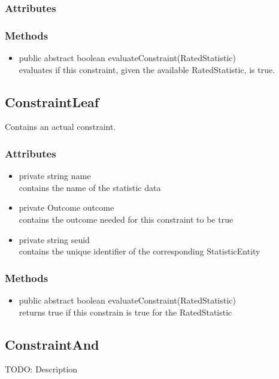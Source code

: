 \subsubsection{Attributes}
\subsubsection{Methods}
\begin{itemize}
	\item public abstract boolean evaluateConstraint(RatedStatistic)\\
	evaluates if this constraint, given the available RatedStatistic, is true. 
\end{itemize}		


\subsection{ConstraintLeaf }
Contains an actual constraint.

\subsubsection{Attributes}
\begin{itemize}
	\item private  string name\\
	contains the name of the statistic data
	\item private  Outcome outcome\\
	contains the outcome needed for this constraint to be true
	\item private  string seuid\\
	contains the unique identifier of the corresponding StatisticEntity
\end{itemize}
\subsubsection{Methods}
\begin{itemize}
	\item public abstract boolean evaluateConstraint(RatedStatistic)\\
	returns true if this constrain is true for the RatedStatistic
\end{itemize}


\subsection{ConstraintAnd }
TODO: Description

